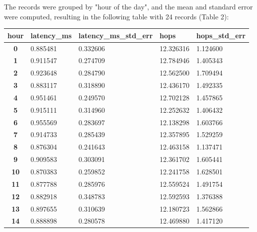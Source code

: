 \documentclass[a4paper,10pt]{article}
\begin{document}
\clearpage 

The records were grouped by "hour of the day", and the mean and standard error were computed, resulting in the following table with 24 records (Table 2):


\begin{table}[h!]
\centering

\begin{tabular}{|c|l|l|l|l|}
\hline
\multicolumn{1}{|l|}{hour} & latency\_ms & latency\_ms\_std\_err & hops      & hops\_std\_err \\ \hline
\textbf{0}                 & 0.885481    & 0.332606              & 12.326316 & 1.124600       \\ \hline
\textbf{1}                 & 0.911547    & 0.274709              & 12.784946 & 1.405343       \\ \hline
\textbf{2}                 & 0.923648    & 0.284790              & 12.562500 & 1.709494       \\ \hline
\textbf{3}                 & 0.883117    & 0.318890              & 12.436170 & 1.492335       \\ \hline
\textbf{4}                 & 0.951461    & 0.249570              & 12.702128 & 1.457865       \\ \hline
\textbf{5}                 & 0.915111    & 0.314960              & 12.252632 & 1.406432       \\ \hline
\textbf{6}                 & 0.955569    & 0.283697              & 12.138298 & 1.603766       \\ \hline
\textbf{7}                 & 0.914733    & 0.285439              & 12.357895 & 1.529259       \\ \hline
\textbf{8}                 & 0.876304    & 0.241643              & 12.463158 & 1.137471       \\ \hline
\textbf{9}                 & 0.909583    & 0.303091              & 12.361702 & 1.605441       \\ \hline
\textbf{10}                & 0.870383    & 0.259852              & 12.241758 & 1.628501       \\ \hline
\textbf{11}                & 0.877788    & 0.285976              & 12.559524 & 1.491754       \\ \hline
\textbf{12}                & 0.882918    & 0.348783              & 12.592593 & 1.376388       \\ \hline
\textbf{13}                & 0.897655    & 0.310639              & 12.180723 & 1.562866       \\ \hline
\textbf{14}                & 0.888898    & 0.280578              & 12.469880 & 1.417120       \\ \hline

\end{tabular}
\end{table}
\end{document}
